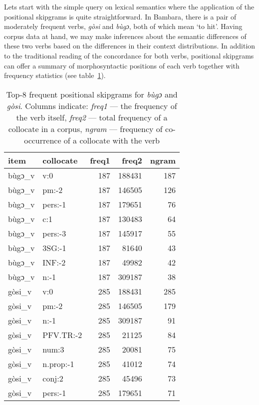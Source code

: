 \documentclass[12pt]{article}
\begin{document}
Lets start with the simple query on lexical semantics where the
application of the positional skipgrams is quite straightforward.  In
Bambara, there is a pair of moderately frequent verbs, \textit{gòsi}
and \textit{bùgɔ}, both of which mean ‘to hit’. Having corpus data at
hand, we may make inferences about the semantic differences of these
two verbs based on the differences in their context distributions.  In
addition to the traditional reading of the concordance for both verbs,
positional skipgrams can offer a summary of morphosyntactic positions of
each verb together with frequency statistics (see table~\ref{tab:bugogosi.freq}). 

\begin{table}[ht]
  \small
  \centering
  \begin{tabular}{llrrr}
    \toprule
    item & collocate & freq1 & freq2 & ngram\\
    \midrule
    bùgɔ\_v & v:0 & 187 & 188431 & 187\\
    bùgɔ\_v & pm:-2 & 187 & 146505 & 126\\
    bùgɔ\_v & pers:-1 & 187 & 179651 & 76\\
    bùgɔ\_v & c:1 & 187 & 130483 & 64\\
    bùgɔ\_v & pers:-3 & 187 & 145917 & 55\\
    bùgɔ\_v & 3SG:-1 & 187 & 81640 & 43\\
    bùgɔ\_v & INF:-2 & 187 & 49982 & 42\\
    bùgɔ\_v & n:-1 & 187 & 309187 & 38\\
    \addlinespace
    gòsi\_v & v:0 & 285 & 188431 & 285\\
    gòsi\_v & pm:-2 & 285 & 146505 & 179\\
    gòsi\_v & n:-1 & 285 & 309187 & 91\\
    gòsi\_v & PFV.TR:-2 & 285 & 21125 & 84\\
    gòsi\_v & num:3 & 285 & 20081 & 75\\
    gòsi\_v & n.prop:-1 & 285 & 41012 & 74\\
    gòsi\_v & conj:2 & 285 & 45496 & 73\\
    gòsi\_v & pers:-1 & 285 & 179651 & 71\\
    \bottomrule
  \end{tabular}
  
  \caption{Top-8 frequent positional skipgrams for \textit{bùgɔ} and
    \textit{gòsi}. Columns indicate: \textit{freq1} — the frequency of
    the verb itself, \textit{freq2} — total frequency of a collocate
    in a corpus, \textit{ngram} — frequency of co-occurrence of a
    collocate with the verb}
  \label{tab:bugogosi.freq}
\end{table}
\end{document}

